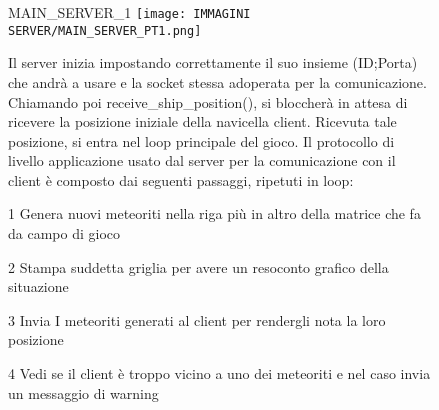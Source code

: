 \documentclass{article}
\begin{document}
\begin{enumerate}
    \begin{figure}[!htb]
    \item MAIN\_SERVER\_1
        \centering
        \texttt{[image: IMMAGINI SERVER/MAIN\_SERVER\_PT1.png]}
        \raggedright\par
        Il server inizia impostando correttamente il suo insieme (ID;Porta) che andrà a usare e la socket stessa adoperata per la comunicazione.
        Chiamando poi receive\_ship\_position(), si bloccherà in attesa di ricevere la posizione iniziale della navicella client.
        Ricevuta tale posizione, si entra nel loop principale del gioco.
        Il protocollo di livello applicazione usato dal server per la comunicazione con il client è composto dai seguenti passaggi, ripetuti in loop:
        \item[1] Genera nuovi meteoriti nella riga più in altro della matrice che fa da campo di gioco
        \item[2] Stampa suddetta griglia per avere un resoconto grafico della situazione
        \item[3] Invia I meteoriti generati al client per rendergli nota la loro posizione
        \item[4] Vedi se il client è troppo vicino a uno dei meteoriti e nel caso invia un messaggio di warning
    \end{figure}


\end{enumerate}
\end{document}
